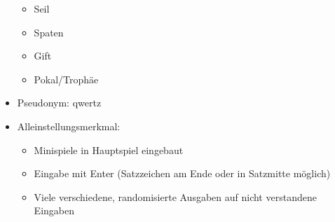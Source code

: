 \documentclass[10pt,a4paper]{article}
\begin{document}
\begin{itemize}
\begin{itemize}
\item Seil
\item Spaten
\item Gift
\item Pokal/Trophäe
\end{itemize}
\item Pseudonym: qwertz
\item Alleinstellungsmerkmal:
\begin{itemize}
\item Minispiele in Hauptspiel eingebaut
\item Eingabe mit Enter (Satzzeichen am Ende oder in Satzmitte möglich)
\item Viele verschiedene, randomisierte Ausgaben auf nicht verstandene Eingaben
\end{itemize}
\end{itemize}
\end{document}

